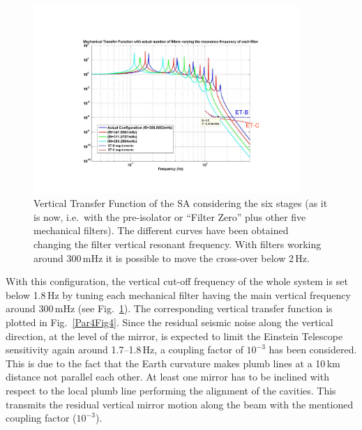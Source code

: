 \begin{figure}[t]
	\begin{center}
		\includegraphics[width=0.9\textwidth]{Detector/SASandSUS/SuspensionSystems/Suspension_Figures/Par4-Fig5.pdf}
			\caption{Vertical Transfer Function of the SA considering the six stages (as it is now, i.e.\ with the pre-isolator or ``Filter Zero'' plus other five mechanical filters). The different curves have been obtained changing the filter vertical resonant frequency. With filters working around 300\,mHz it is possible to move the cross-over below 2\,Hz.}
\label{Par4Fig5}
	\end{center}
\end{figure}
%
With this configuration, the vertical cut-off frequency of the whole system is set below 1.8\,Hz by tuning each mechanical filter having the main vertical frequency around 300\,mHz (see Fig.~\ref{Par4Fig5}). The corresponding vertical transfer function is plotted in Fig.~\ref{Par4Fig4}. Since the residual seismic noise along the vertical direction, at the level of the mirror, is expected to limit the Einstein Telescope sensitivity again around 1.7--1.8\,Hz, a coupling factor of $10^{-3}$ has been considered. This is due to the fact that the Earth curvature makes plumb lines at a 10\,km distance not parallel each other. At least one mirror has to be inclined with respect to the local plumb line performing the alignment of the cavities. This transmits the residual vertical mirror motion along the beam with the mentioned coupling factor ($10^{-3}$).
%
